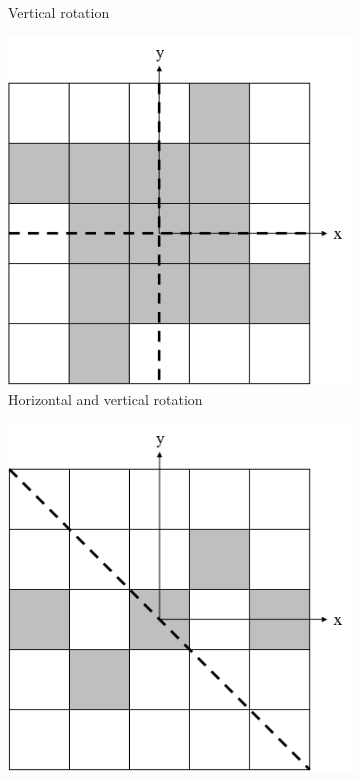 \begin{figure}[H]
\begin{subfigure}[t]{0.3\textwidth}
		\caption{Vertical rotation}
	\end{subfigure}
	\hfill
	\begin{subfigure}[t]{0.3\textwidth}
		\centering
		\includegraphics[width=\textwidth]{LSSymRotHV.png}
		\caption{Horizontal and vertical rotation}
	\end{subfigure}
	\hfill
	\begin{subfigure}[t]{0.3\textwidth}
		\centering
		\includegraphics[width=\textwidth]{LSSymRotD.png}

\end{subfigure}
\end{figure}

